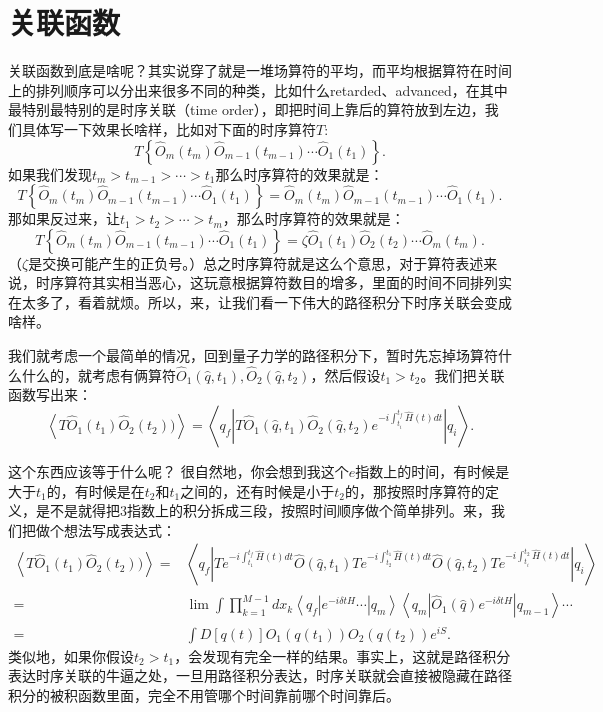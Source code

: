 \documentclass[12pt, a4paper, oneside]{ctexart}
\begin{document}
\section{关联函数}
关联函数到底是啥呢？其实说穿了就是一堆场算符的平均，而平均根据算符在时间上的排列顺序可以分出来很多不同的种类，比如什么retarded、advanced，在其中最特别最特别的是时序关联（time order），即把时间上靠后的算符放到左边，我们具体写一下效果长啥样，比如对下面的时序算符$T$:
\begin{equation}
    T\left\{  \hat O_m(t_m) \hat O_{m-1}(t_{m-1})\cdots \hat O_1(t_1) \right\}.
\end{equation}
如果我们发现$t_m>t_{m-1}>\cdots>t_1$那么时序算符的效果就是：
\begin{equation}
    T\left\{  \hat O_m(t_m) \hat O_{m-1}(t_{m-1})\cdots \hat O_1(t_1) \right\}=\hat O_m(t_m) \hat O_{m-1}(t_{m-1})\cdots \hat O_1(t_1) .
\end{equation}
那如果反过来，让$t_1>t_2>\cdots >t_m$，那么时序算符的效果就是：
\begin{equation}
    T\left\{  \hat O_m(t_m) \hat O_{m-1}(t_{m-1})\cdots \hat O_1(t_1) \right\}=\zeta\hat O_1(t_1) \hat O_{2}(t_{2})\cdots \hat O_m(t_m) .
\end{equation}
（$\zeta$是交换可能产生的正负号。）总之时序算符就是这么个意思，对于算符表述来说，时序算符其实相当恶心，这玩意根据算符数目的增多，里面的时间不同排列实在太多了，看着就烦。所以，来，让我们看一下伟大的路径积分下时序关联会变成啥样。

我们就考虑一个最简单的情况，回到量子力学的路径积分下，暂时先忘掉场算符什么什么的，就考虑有俩算符$\hat O_1(\hat q,t_1),\hat O_2(\hat q,t_2)$，然后假设$t_1>t_2$。我们把关联函数写出来：
\begin{equation}
    \left< T\hat O_1(t_1)\hat O_2(t_2)) \right>=\left<q_f|T\hat O_1(\hat q,t_1)\hat O_2(\hat q,t_2)e^{-i\int_{t_i}^{t_f}\hat H(t)dt}| q_i   \right>.
\end{equation}

这个东西应该等于什么呢？ 很自然地，你会想到我这个$e$指数上的时间，有时候是大于$t_1$的，有时候是在$t_2$和$t_1$之间的，还有时候是小于$t_2$的，那按照时序算符的定义，是不是就得把$3$指数上的积分拆成三段，按照时间顺序做个简单排列。来，我们把做个想法写成表达式：
\begin{align}
\left< T\hat O_1(t_1)\hat O_2(t_2)) \right>=&\left<q_f | Te^{-i\int_{t_1}^{t_f}\hat H(t)dt}\hat O(\hat q,t_1)  Te^{-i\int_{t_2}^{t_1}\hat H(t)dt} \hat O(\hat q,t_2) Te^{-i\int_{t_i}^{t_2}\hat H(t)dt} | q_i \right>\nonumber\\ 
=&\lim\int \prod_{k=1}^{M-1}dx_k\left<q_f | e^{-i\delta t H}\cdots|q_m \right> \left<q_m | \hat O_1(\hat q)e^{-i\delta t H}|q_{m-1} \right>\cdots\nonumber\\
 =&\int D[q(t)] O_1(q(t_1))O_2(q(t_2))e^{iS}  . 
 \end{align}
类似地，如果你假设$t_2>t_1$，会发现有完全一样的结果。事实上，这就是路径积分表达时序关联的牛逼之处，一旦用路径积分表达，时序关联就会直接被隐藏在路径积分的被积函数里面，完全不用管哪个时间靠前哪个时间靠后。
\end{document}
